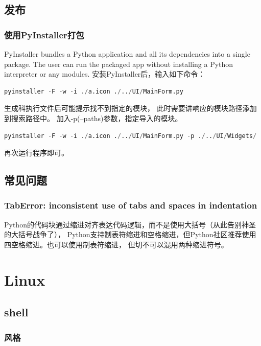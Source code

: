 \documentclass{book}
\begin{document}
\section{发布}

\subsection{使用PyInstaller打包}

PyInstaller bundles a Python application and all its dependencies into a single package. 
The user can run the packaged app without installing a Python interpreter or any modules.
安装PyInstaller后，输入如下命令：

\begin{lstlisting}[language=Python]
pyinstaller -F -w -i ./a.icon ./../UI/MainForm.py
\end{lstlisting}

生成科执行文件后可能提示找不到指定的模块，
此时需要讲响应的模块路径添加到搜索路径中。
加入-p(--paths)参数，指定导入的模块。

\begin{lstlisting}[language=Python]
pyinstaller -F -w -i ./a.icon ./../UI/MainForm.py -p ./../UI/Widgets/
\end{lstlisting}

再次运行程序即可。

\section{常见问题}

\subsection{TabError: inconsistent use of tabs and spaces in indentation}

Python的代码块通过缩进对齐表达代码逻辑，而不是使用大括号（从此告别神圣的大括号战争了），
Python支持制表符缩进和空格缩进，但Python社区推荐使用四空格缩进。也可以使用制表符缩进，
但切不可以混用两种缩进符号。

\chapter{Linux}

\section{shell}

\subsection{风格}
\end{document}
